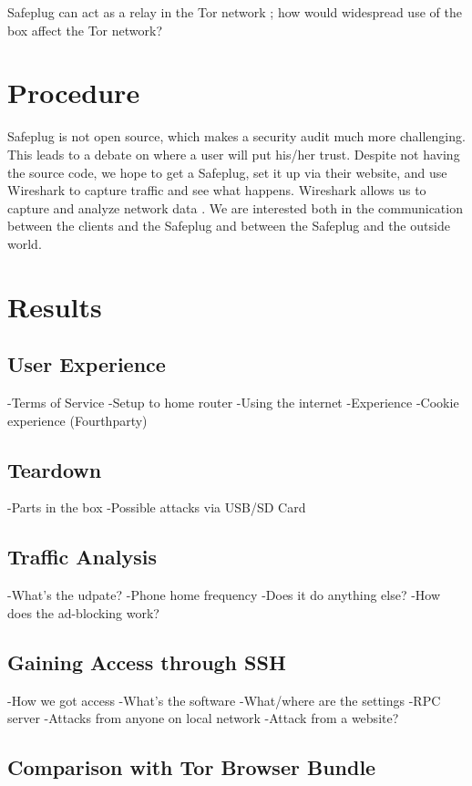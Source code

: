 \documentclass[12pt, letterpaper]{article}
\begin{document}
Safeplug can act as a relay in the Tor network \cite{techreview}; how would widespread use of the box affect the Tor network?

\section{Procedure}
Safeplug is not open source, which makes a security audit much more challenging.  This leads to a debate on where a user will put his/her trust.  Despite not having the source code, we hope to get a Safeplug, set it up via their website, and use Wireshark to capture traffic and see what happens.  Wireshark allows us to capture and analyze network data \cite{wireshark}.  We are interested both in the communication between the clients and the Safeplug and between the Safeplug and the outside world.  

\section{Results}

\subsection{User Experience}
    -Terms of Service
    -Setup to home router
    -Using the internet
    -Experience
    -Cookie experience (Fourthparty)

\subsection{Teardown}
    -Parts in the box
    -Possible attacks via USB/SD Card

\subsection{Traffic Analysis}
    -What's the udpate?
    -Phone home frequency
    -Does it do anything else?
    -How does the ad-blocking work?

\subsection{Gaining Access through SSH}
    -How we got access
    -What's the software
    -What/where are the settings
    -RPC server
        -Attacks from anyone on local network
        -Attack from a website?

\subsection{Comparison with Tor Browser Bundle}
\end{document}
